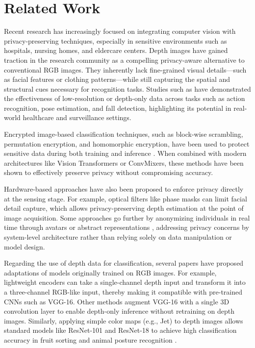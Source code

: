 \section{Related Work}
Recent research has increasingly focused on integrating computer vision with privacy-preserving techniques, especially in sensitive environments such as hospitals, nursing homes, and eldercare centers. Depth images have gained traction in the research community as a compelling privacy-aware alternative to conventional RGB images. They inherently lack fine-grained visual details—such as facial features or clothing patterns—while still capturing the spatial and structural cues necessary for recognition tasks. Studies such as \cite{PrivacyPreservingActionRecognition, HumanPoseEstimationPrivacy} have demonstrated the effectiveness of low-resolution or depth-only data across tasks such as action recognition, pose estimation, and fall detection, highlighting its potential in real-world healthcare and surveillance settings.

Encrypted image-based classification techniques, such as block-wise scrambling, permutation encryption, and homomorphic encryption, have been used to protect sensitive data during both training and inference \cite{PrivacyPreservingVisionTransformer, PrivacyPreservingConvMixer}. When combined with modern architectures like Vision Transformers or ConvMixers, these methods have been shown to effectively preserve privacy without compromising accuracy.

Hardware-based approaches have also been proposed to enforce privacy directly at the sensing stage. For example, optical filters like phase masks \cite{LearningPhaseMask} can limit facial detail capture, which allows privacy-preserving depth estimation at the point of image acquisition. Some approaches go further by anonymizing individuals in real time through avatars or abstract representations \cite{AIPrivacyElderCare}, addressing privacy concerns by system-level architecture rather than relying solely on data manipulation or model design.

Regarding the use of depth data for classification, several papers have proposed adaptations of models originally trained on RGB images. For example, lightweight encoders \cite{ConvolutionBasedEncoding} can take a single-channel depth input and transform it into a three-channel RGB-like input, thereby making it compatible with pre-trained CNNs such as VGG-16. Other methods augment VGG-16 with a single 3D convolution layer \cite{RGBDObjectRecognition} to enable depth-only inference without retraining on depth images. Similarly, applying simple color maps (e.g., Jet) to depth images allows standard models like ResNet-101 and ResNet-18 to achieve high classification accuracy in fruit sorting and animal posture recognition \cite{FruitClassificationDepthImages, SowPostureClassification}.

